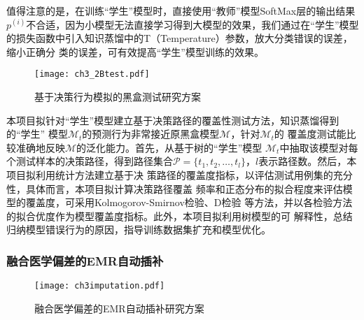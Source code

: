 值得注意的是，在训练``学生''模型时，直接使用``教师''模型SoftMax层的输出结果
$p^{(i)}$不合适，因为小模型无法直接学习得到大模型的效果，我们通过在``学生''模型
的损失函数中引入知识蒸馏中的T（Temperature）参数，放大分类错误的误差，缩小正确分
类的误差，可有效提高``学生''模型训练的效果。

\begin{figure}
    \begin{small}
        \begin{center}
            \texttt{[image: ch3\_2Btest.pdf]}
        \end{center}
        \caption{基于决策行为模拟的黑盒测试研究方案}
        \label{fig:ch3:2Btest}
    \end{small}
\end{figure}

本项目拟针对``学生''模型建立基于决策路径的覆盖性测试方法，知识蒸馏得到的``学生''
模型$\mathcal M_t$的预测行为非常接近原黑盒模型$\mathcal M$，针对$\mathcal M_t$的
覆盖度测试能比较准确地反映$\mathcal M$的泛化能力。首先，从基于树的``学生''模型
$\mathcal M_t$中抽取该模型对每个测试样本的决策路径，得到路径集合$\mathcal
P=\{t_1, t_2,\dots, t_l\}$，$l$表示路径数。然后，本项目拟利用统计方法建立基于决
策路径的覆盖度指标，以评估测试用例集的充分性，具体而言，本项目拟计算决策路径覆盖
频率和正态分布的拟合程度来评估模型的覆盖度，可采用Kolmogorov-Smirnov检验、D检验
等方法，并以各检验方法的拟合优度作为模型覆盖度指标。此外，本项目拟利用树模型的可
解释性，总结归纳模型错误行为的原因，指导训练数据集扩充和模型优化。

\subsubsection{融合医学偏差的EMR自动插补}\label{ch3_2}

\begin{comment}
融合医学偏差的EMR自动插补旨在将在时间维度上不规则的电子医疗记录补全为完整的电子
医疗记录，可降低后续预测模型的复杂度和训练时间。电子医疗记录除了反映患者的身体健
康状态，还包含的患者与医院、医生与电子病历系统的交互过程，通常这些附加因素会引入
医学偏差。研究表明，医学偏差可用于对患者更精细的分类，对于理解电子医疗记录有重要
辅助作用，许多医学偏差都会通过医疗特征被记录的时间推断出来，这为建模引入医学偏差
提供了理论基础。本项目利用医疗特征记录的时间和电子医疗记录中缺失值出现的位置，学
习特征的缺失规律，进而将所学缺失规律融入插补模型中。
\end{comment}

\begin{figure}
    \begin{small}
        \begin{center}
            \texttt{[image: ch3imputation.pdf]}
        \end{center}
        \caption{融合医学偏差的EMR自动插补研究方案}
        \label{fig:ch3:imputation}
    \end{small}
\end{figure}

